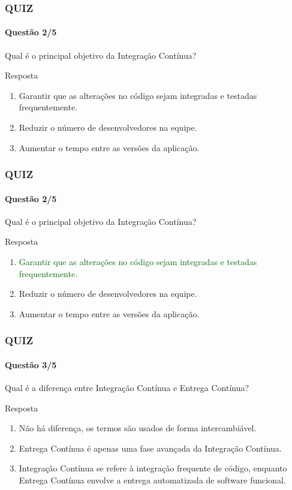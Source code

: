 \documentclass[
	9pt, %
	t, %
]{beamer}
\begin{document}
\begin{frame}
	\frametitle{QUIZ}
	\framesubtitle{Questão 2/5}

	{\Large Qual é o principal objetivo da Integração Contínua?}

	\begin{exampleblock}{Resposta}
		\begin{enumerate}[a]
			\item Garantir que as alterações no código sejam integradas e testadas frequentemente.
			\item Reduzir o número de desenvolvedores na equipe.
			\item Aumentar o tempo entre as versões da aplicação.
		\end{enumerate}
	\end{exampleblock}

\end{frame}

\begin{frame}
	\frametitle{QUIZ}
	\framesubtitle{Questão 2/5}

	{\Large Qual é o principal objetivo da Integração Contínua?}

	\begin{exampleblock}{Resposta}
		\begin{enumerate}[a]
			\item \textcolor{darkgreen}{Garantir que as alterações no código sejam integradas e testadas frequentemente.}
			\item Reduzir o número de desenvolvedores na equipe.
			\item Aumentar o tempo entre as versões da aplicação.
		\end{enumerate}
	\end{exampleblock}

\end{frame}

\begin{frame}
	\frametitle{QUIZ}
	\framesubtitle{Questão 3/5}

	{\Large Qual é a diferença entre Integração Contínua e Entrega Contínua? }

	\begin{exampleblock}{Resposta}
		\begin{enumerate}[a]
			\item Não há diferença, os termos são usados de forma intercambiável.
			\item Entrega Contínua é apenas uma fase avançada da Integração Contínua.
			\item Integração Contínua se refere à integração frequente de código, enquanto Entrega Contínua envolve a entrega automatizada de software funcional.
		\end{enumerate}
	\end{exampleblock}

\end{frame}
\end{document}
